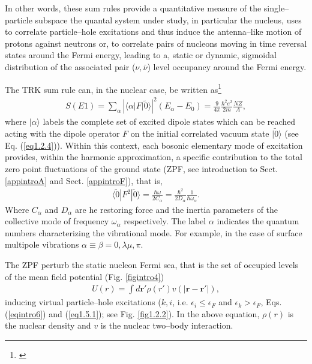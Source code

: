 In other words, these sum rules provide a quantitative measure of the single--particle subspace the quantal system under study, in particular the nucleus, uses to correlate particle--hole excitations and thus induce the antenna--like motion of protons against neutrons or, to correlate pairs of nucleons moving in time reversal states around the Fermi energy, leading to a, static or dynamic, sigmoidal distribution of the associated pair ($\nu,\bar{\nu}$) level occupancy around the Fermi energy. 


The TRK sum rule can, in the nuclear case, be written as\footnote{\cite{Bohr:75,Bertsch:05,Bortignon:98}}
\begin{align}\label{eq_intro1}
S(E1)=\sum_\alpha\left|\langle\alpha|F|\tilde 0\rangle\right|^2(E_\alpha-E_0)=\frac{9}{4\pi}\frac{\hbar^2e^2}{2m}\frac{NZ}{A},
\end{align}
where $|\alpha\rangle$ labels the complete set of excited dipole states which can be reached acting with the dipole operator $F$ on the initial correlated vacuum state $|\tilde 0\rangle$ (see Eq. (\ref{eq1.2.4})). Within this context, each bosonic elementary mode of excitation provides, within the harmonic approximation, a specific contribution to the total zero point fluctuations of the ground state (ZPF, see introduction to Sect. \ref{appintroA} and Sect. \ref{appintroF}), that is,
\begin{align}\label{eqintro2}
\langle\tilde 0|F^2|\tilde 0\rangle=\frac{\hbar \omega}{2C_\alpha}=\frac{\hbar^2}{2D_\alpha}\frac{1}{\hbar\omega_\alpha}.
\end{align}
Where $C_\alpha$ and $D_\alpha$ are he restoring force and the inertia parameters of the collective mode of frequency $\omega_\alpha$ respectively. The label $\alpha$ indicates the quantum numbers characterizing the vibrational mode. For example, in the case of surface multipole vibrations $\alpha\equiv\beta=0,\lambda\mu,\pi$.



The ZPF perturb the static nucleon Fermi sea, that is the set of occupied levels of the mean field potential (Fig. \ref{figintro4})
\begin{align}\label{eqintro3}
U(r)=\int d\mathbf r' \rho(r')v(|\mathbf r-\mathbf r'|),
\end{align}
inducing virtual particle--hole excitations ($k,i$, i.e. $\epsilon_i\leq\epsilon_F$ and $\epsilon_k>\epsilon_F$,  Eqs. (\ref{eqintro6}) and (\ref{eq1.5.1}); see Fig. \ref{fig1.2.2}). In the above equation, $\rho(r)$ is the nuclear density and $v$ is the nuclear two--body interaction.  


